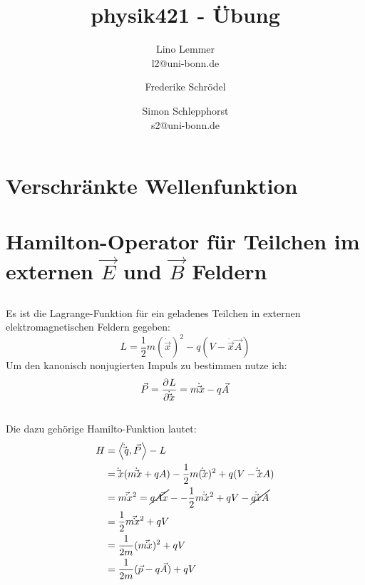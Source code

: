 


\setcounter{thezettel}{6}
\renewcommand\thesection{\arabic{thezettel}.\arabic{section}}

\newcommand\ccancel[2][black]{\renewcommand\CancelColor{\color{#1}}\cancel{#2}}


\title{physik421 - Übung }
\author{Lino Lemmer \\ \small{l2@uni-bonn.de} \and Frederike Schrödel \and Simon Schlepphorst\\ \small{s2@uni-bonn.de}}


\maketitle

\section{Verschränkte Wellenfunktion}
\subsection{}

\section{Hamilton-Operator für Teilchen im externen $\vec E$ und $\vec B$ Feldern}
\subsection{}
Es ist die Lagrange-Funktion für ein geladenes Teilchen in externen elektromagnetischen Feldern gegeben:
\[
    L = \frac 12 m(\dot\vec x)^2-q(V-\dot\vec x\vec A)
\]
Um den kanonisch nonjugierten Impuls zu bestimmen nutze ich:
\[
    \vec P = \dpd{L}{\dot\vec x} = m\dot\vec x-q\vec A
\]

\subsection{}
Die dazu gehörige Hamilto-Funktion lautet:
\begin{align*}
    H &= \left\langle\dot\vec q,\vec P\right\rangle-L \\
      &= \dot\vec x(m\dot\vec x+qA) -\frac 12 m(\dot\vec x)^2+q(V-\dot\vec xA) \\
      &= m\vec\dot x^2=\cancel{qA\vec\dot x}--\frac 12m\dot\vec x^2+qV-\cancel{q\dot\vec xA} \\
      &= \frac 12 m\vec\dot x^2+qV \\
      &= \frac{1}{2m}(m\vec\dot x)^2+qV \\
      &= \frac{1}{2m}(\vec p-q\vec A)+qV
\end{align*}

